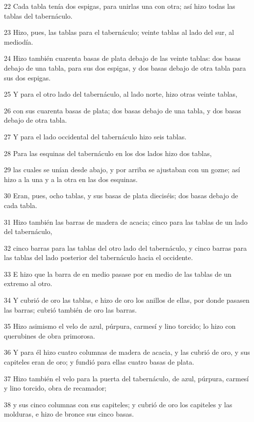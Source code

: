 \par 22 Cada tabla tenía dos espigas, para unirlas una con otra; así hizo todas las tablas del tabernáculo.
\par 23 Hizo, pues, las tablas para el tabernáculo; veinte tablas al lado del sur, al mediodía.
\par 24 Hizo también cuarenta basas de plata debajo de las veinte tablas: dos basas debajo de una tabla, para sus dos espigas, y dos basas debajo de otra tabla para sus dos espigas.
\par 25 Y para el otro lado del tabernáculo, al lado norte, hizo otras veinte tablas,
\par 26 con sus cuarenta basas de plata; dos basas debajo de una tabla, y dos basas debajo de otra tabla.
\par 27 Y para el lado occidental del tabernáculo hizo seis tablas.
\par 28 Para las esquinas del tabernáculo en los dos lados hizo dos tablas,
\par 29 las cuales se unían desde abajo, y por arriba se ajustaban con un gozne; así hizo a la una y a la otra en las dos esquinas.
\par 30 Eran, pues, ocho tablas, y sus basas de plata dieciséis; dos basas debajo de cada tabla.
\par 31 Hizo también las barras de madera de acacia; cinco para las tablas de un lado del tabernáculo,
\par 32 cinco barras para las tablas del otro lado del tabernáculo, y cinco barras para las tablas del lado posterior del tabernáculo hacia el occidente.
\par 33 E hizo que la barra de en medio pasase por en medio de las tablas de un extremo al otro.
\par 34 Y cubrió de oro las tablas, e hizo de oro los anillos de ellas, por donde pasasen las barras; cubrió también de oro las barras.
\par 35 Hizo asimismo el velo de azul, púrpura, carmesí y lino torcido; lo hizo con querubines de obra primorosa.
\par 36 Y para él hizo cuatro columnas de madera de acacia, y las cubrió de oro, y sus capiteles eran de oro; y fundió para ellas cuatro basas de plata.
\par 37 Hizo también el velo para la puerta del tabernáculo, de azul, púrpura, carmesí y lino torcido, obra de recamador;
\par 38 y sus cinco columnas con sus capiteles; y cubrió de oro los capiteles y las molduras, e hizo de bronce sus cinco basas.

